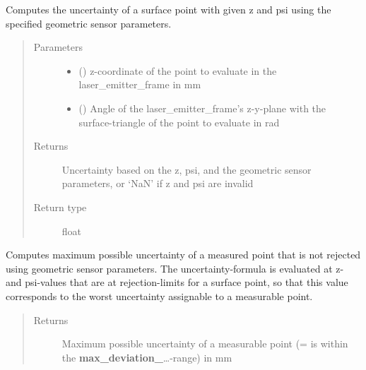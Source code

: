 \documentclass[letterpaper,10pt,english]{sphinxmanual}
\begin{document}
\begin{fulllineitems}

\begin{fulllineitems}
\label{\detokenize{module_sensor_model:agiprobot_measurement.sensor_model.SensorModel.evaluate_uncertainty}}
Computes the uncertainty of a surface point with given z and psi using the specified geometric sensor parameters.
\begin{quote}\begin{description}
\item[{Parameters}] \leavevmode\begin{itemize}
\item {} 
 () \textendash{} z-coordinate of the point to evaluate in the laser\_emitter\_frame in mm

\item {} 
 () \textendash{} Angle of the laser\_emitter\_frame’s z-y-plane with the surface-triangle of the point to evaluate in rad

\end{itemize}

\item[{Returns}] \leavevmode
Uncertainty based on the z, psi, and the geometric sensor parameters, or ‘NaN’ if z and psi are invalid

\item[{Return type}] \leavevmode
float

\end{description}\end{quote}

\end{fulllineitems}


\begin{fulllineitems}
\label{\detokenize{module_sensor_model:agiprobot_measurement.sensor_model.SensorModel.get_max_uncertainty}}
Computes maximum possible uncertainty of a measured point that is not rejected using geometric sensor parameters. 
The uncertainty-formula is evaluated at z- and psi-values that are at rejection-limits for a surface point, so that this value corresponds
to the worst uncertainty assignable to a measurable point.
\begin{quote}\begin{description}
\item[{Returns}] \leavevmode
Maximum possible uncertainty of a measurable point (= is within the {\color{red}\bfseries{}max\_deviation\_}…-range) in mm


\end{description}
\end{quote}
\end{fulllineitems}
\end{fulllineitems}
\end{document}
